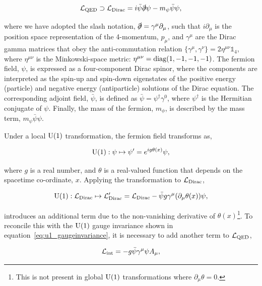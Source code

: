 \begin{equation}
    \mathcal{L}_{\rm{QED}} \supset \mathcal{L}_{\rm{Dirac}} = i\bar{\psi}\slashed{\partial}\psi - m_{\psi}\bar{\psi}\psi,
\end{equation}

\noindent
where we have adopted the slash notation, $\slashed{\partial}=\gamma^\mu\partial_\mu$, such that $i\partial_\mu$ is the position space representation of the 4-momentum, $p_\mu$, and $\gamma^\mu$ are the Dirac gamma matrices that obey the anti-commutation relation $\{\gamma^\mu,\gamma^\nu\}=2\eta^{\mu\nu}\mathbb{1}_4$, where $\eta^{\mu\nu}$ is the Minkowski-space metric: $\eta^{\mu\nu}={\rm{diag}}(1,-1,-1,-1)$. The fermion field, $\psi$, is expressed as a four-component Dirac spinor, where the components are interpreted as the spin-up and spin-down eigenstates of the positive energy (particle) and negative energy (antiparticle) solutions of the Dirac equation. The corresponding adjoint field, $\bar{\psi}$, is defined as $\bar{\psi}=\psi^{\dagger}\gamma^0$, where $\psi^{\dagger}$ is the Hermitian conjugate of $\psi$. Finally, the mass of the fermion, $m_{\phi}$, is described by the mass term, $m_{\psi}\bar{\psi}\psi$.

Under a local ${\rm{U}}(1)$ transformation, the fermion field transforms as,

\begin{equation}
    {\rm{U}}(1): \psi \mapsto \psi' = e^{ig\theta(x)}\psi,
\end{equation}

\noindent
where $g$ is a real number, and $\theta$ is a real-valued function that depends on the spacetime co-ordinate, $x$. Applying the transformation to $\mathcal{L}_{\rm{Dirac}}$,

\begin{equation}\label{eq:u1_dirac}
    {\rm{U}}(1): \mathcal{L}_{\rm{Dirac}} \mapsto \mathcal{L}_{\rm{Dirac}}' = \mathcal{L}_{\rm{Dirac}} - \bar{\psi}g\gamma^\mu(\partial_\mu\theta(x))\psi,
\end{equation}

\noindent
introduces an additional term due to the non-vanishing derivative of $\theta(x)$\footnote{This is not present in global ${\rm{U}}(1)$ transformations where $\partial_\mu\theta=0$.}. To reconcile this with the ${\rm{U}}(1)$ gauge invariance shown in equation~\ref{eq:u1_gaugeinvariance}, it is necessary to add another term to $\mathcal{L}_{\rm{QED}}$,

\begin{equation}\label{eq:qed_interaction}
    \mathcal{L}_{\rm{int}} = -g\bar{\psi}\gamma^{\mu}{\psi}A_\mu,
\end{equation}

